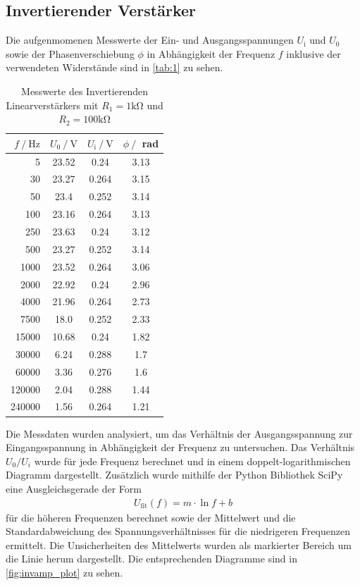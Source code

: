 \documentclass[12pt]{article}
\begin{document}
\subsection{Invertierender Verstärker}
Die aufgenmomenen Messwerte der Ein- und Ausgangsspannungen $U_\text{i}$ und $U_0$ sowie der Phasenverschiebung $\phi$ in Abhängigkeit der Frequenz $f$ inklusive der verwendeten Widerstände sind in \autoref{tab:1} zu sehen.
\begin{table}[H]
  \centering
  \caption{Messwerte des Invertierenden Linearverstärkers mit $R_1=1\unit{\kilo\ohm}$ und $R_2=100\unit{\kilo\ohm}$}
  \begin{tabular}{r | c c c}
  \toprule
   $f\mathbin{/}\unit{\hertz}$ &  $U_0\mathbin{/}\unit{\volt}$&  $U_{\text{i}}\mathbin{/}\unit{\volt}$ & $\phi\mathbin{/}$ rad\\
  \midrule
  5&23.52&0.24&3.13\\
  30&23.27&0.264&3.15\\
  50&23.4&0.252&3.14\\
  100&23.16&0.264&3.13\\
  250&23.63&0.24&3.12\\
  500&23.27&0.252&3.14\\
  1000&23.52&0.264&3.06\\
  2000&22.92&0.24&2.96\\
  4000&21.96&0.264&2.73\\
  7500&18.0&0.252&2.33\\
  15000&10.68&0.24&1.82\\
  30000&6.24&0.288&1.7\\
  60000&3.36&0.276&1.6\\
  120000&2.04&0.288&1.44\\
  240000&1.56&0.264&1.21\\
  \bottomrule
  \end{tabular}
  \label{tab:1}
\end{table}

Die Messdaten wurden analysiert, um das Verhältnis der Ausgangsspannung zur Eingangsspannung in Abhängigkeit der Frequenz zu untersuchen. Das Verhältnis $U_0/U_i$ wurde für jede Frequenz berechnet und in einem doppelt-logarithmischen Diagramm dargestellt. Zusätzlich wurde mithilfe der Python Bibliothek SciPy eine Ausgleichsgerade der Form
\begin{align}
  U_\text{fit}(f)=m\cdot \ln{f}+b
\end{align}
für die höheren Frequenzen berechnet sowie der Mittelwert und die Standardabweichung des Spannungsverhältnisses für die niedrigeren Frequenzen ermittelt\cite{scipy}. Die Unsicherheiten des Mittelwerts wurden als markierter Bereich um die Linie herum dargestellt. Die entsprechenden Diagramme sind in \autoref{fig:invamp_plot} zu sehen.
\end{document}
